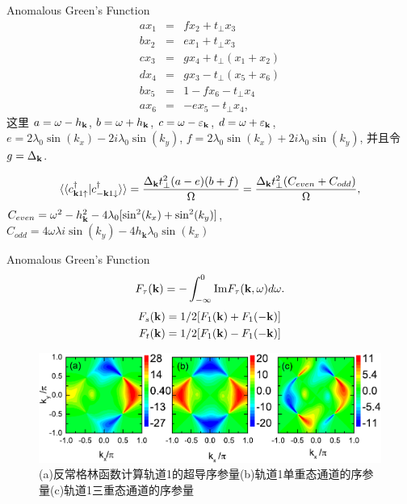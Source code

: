 \documentclass[10pt,aspectratio=169]{beamer} %
\begin{document}
\begin{frame}{Anomalous Green's Function}
\begin{subequations}
	\begin{eqnarray}
	ax_1&=&fx_2+t_\perp x_3
	\\
	bx_2&=&ex_1+t_\perp x_3
	\\
	cx_3&=&gx_4+t_\perp (x_1+x_2)
	\\
	dx_4&=&gx_3-t_\perp (x_5+x_6)
	\\
	bx_5&=&1-fx_6-t_\perp x_4
	\\
	ax_6&=&-ex_5-t_\perp x_4,\label{eom2}
	\end{eqnarray}
\end{subequations}
这里 $a=\omega-h_{\bf k}$, $b=\omega + h_{\bf k}$, $c=\omega-\varepsilon_{\bf k}$,
$d=\omega+\varepsilon_{\bf k}$, $e=2\lambda_0\sin(k_x)-2i \lambda_0\sin(k_y)$, $f=2\lambda_0\sin(k_x) + 2i\lambda_0\sin(k_y)$,
并且令 $g = \Delta_{\bf k}$.

\begin{equation}
\langle\langle c_{{\bf k}1\uparrow}^\dagger|c_{-{\bf k}1\downarrow}^\dagger\rangle\rangle=\frac{\Delta_{\bf k} t_\perp ^2 (a-e) (b+f)}{\Omega}=\frac{\Delta_{\bf k}t_\perp^2(C_{even}+C_{odd})}{\Omega},\label{anlyagf}
\end{equation} $C_{even}=\omega^2-h^2_{\bf{k}}-4\lambda_0[\sin^2(k_x)+\sin^2(k_y)]$, $C_{odd}=4\omega\lambda i\sin(k_y)-4h_{\mathbf{k}}\lambda_0\sin(k_x)$
\end{frame}
\begin{frame}{Anomalous Green's Function}
\begin{equation}
F_\tau({\bf k})=-\int_{-\infty}^0\mathrm{Im}F_\tau({\bf k},\omega)d\omega.
\end{equation}
\begin{equation}
\begin{aligned}
F_s({\bf k})&=1/2[F_1({\bf k})+F_1(-{\bf k})]\\
F_t({\bf k})&=1/2[F_1({\bf k})-F_1(-{\bf k})]
\end{aligned}
\end{equation}
\begin{figure}[h]
	\centering
	\includegraphics[scale=0.6]{pic/fig22}
	\caption{(a)反常格林函数计算轨道1的超导序参量(b)轨道1单重态通道的序参量(c)轨道1三重态通道的序参量}\label{fig21}
\end{figure}
\end{frame}
\end{document}
